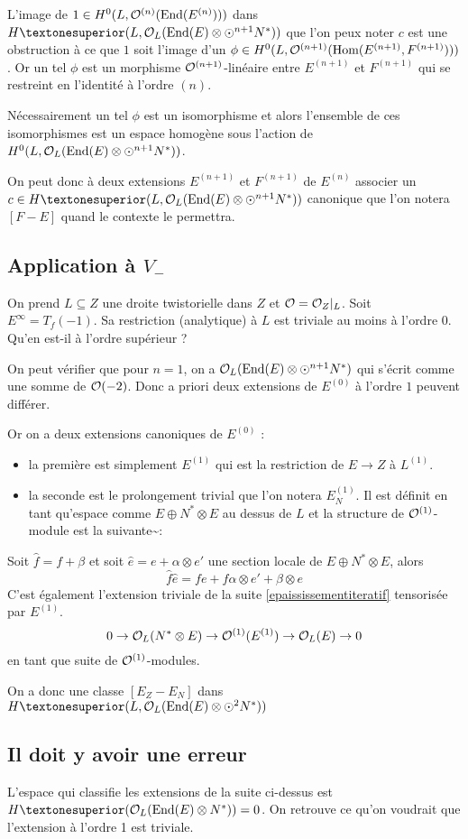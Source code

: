 \documentclass[a4paper]{amsart}
\begin{document}
L'image de $1 \in H^0(L,\mathcal{O}^{(n)}(\text{End}(E^{(n)})))$ dans $H¹(L,\Oo_L(\End(E) \otimes \odot^{n+1}N^*))$ que l'on peux noter $c$ est une obstruction à ce que $1$ soit l'image d'un $\phi \in H^0(L,\mathcal{O}^{(n+1)}(\text{Hom}(E^{(n+1)},F^{(n+1)})))$. Or un tel $\phi$ est un morphisme $\mathcal{O}^{(n+1)}$-linéaire entre $E^{(n+1)}$ et $F^{(n+1)}$ qui se restreint en l'identité à l'ordre $(n)$.

Nécessairement un tel $\phi$ est un isomorphisme et alors l'ensemble de ces isomorphismes est un espace homogène sous l'action de $H^0(L,\mathcal{O}_L(\text{End}(E) \otimes \odot^{n+1}N^*))$.

On peut donc à deux extensions $E^{(n+1)}$ et $F^{(n+1)}$ de $E^{(n)}$ associer un $c \in H¹(L,\Oo_L(\End(E) \otimes \odot^{n+1}N^*))$ canonique que l'on notera $[F-E]$ quand le contexte le permettra.
\subsection{Application à $V_-$}
\label{sec-3-3}

On prend $L \subseteq Z$ une droite twistorielle dans $Z$ et $\mathcal{O} = \mathcal{O}_Z \vert_L$.
Soit $E^\infty = T_f(-1)$. Sa restriction (analytique) à $L$ est triviale au moins à l'ordre $0$. Qu'en est-il à l'ordre supérieur ?

On peut vérifier que pour $n=1$, on a $\mathcal{O}_L(\text{End}(E) \otimes \odot^{n+1}N^*)$ qui s'écrit comme une somme de $\mathcal{O}(-2)$. Donc a priori deux extensions de $E^{(0)}$ à l'ordre $1$ peuvent différer.

Or on a deux extensions canoniques de $E^{(0)}$ :
\begin{itemize}
\item la première est simplement $E^{(1)}$ qui est la restriction de $E \to Z$ à $L^{(1)}$.
\item la seconde est le prolongement trivial que l'on notera $E_N^{(1)}$. Il est définit en tant qu'espace comme $E \oplus N^* \otimes E$ au dessus de $L$ et la structure de $\mathcal{O}^{(1)}$-module est la suivante\~{}:
\end{itemize}
Soit $\hat{f} = f + \beta$ et soit $\hat{e} = e + \alpha \otimes e'$ une section locale de $E \oplus N^* \otimes E$, alors
\[
\hat{f}\hat{e} = fe + f\alpha \otimes e' + \beta \otimes e
\]
C'est également l'extension triviale de la suite \eqref{epaississementiteratif} tensorisée par $E^{(1)}$.
\[
0 \to \mathcal{O}_L(N^* \otimes E) \to \mathcal{O}^{(1)}(E^{(1)}) \to \mathcal{O}_L(E) \to 0
\]
en tant que suite de $\mathcal{O}^{(1)}$-modules.

On a donc une classe $[E_Z-E_N]$ dans $H¹(L,\Oo_L(\End(E) \otimes \odot^{2}N^*))$
\subsection{Il doit y avoir une erreur}
\label{sec-3-4}

L'espace qui classifie les extensions de la suite ci-dessus est 
$H¹(\Oo_L(\End(E)\otimes N^*)) = 0$. On retrouve ce qu'on voudrait que l'extension à l'ordre 1 est triviale.

 




\end{document}
